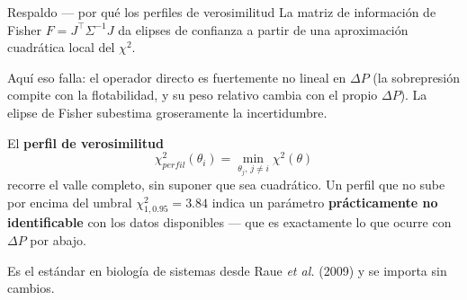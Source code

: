 \documentclass[aspectratio=169,10pt,t]{beamer}
\begin{document}
\begin{frame}{Respaldo — por qué los perfiles de verosimilitud}
\small
La matriz de información de Fisher $F=J^\top\Sigma^{-1}J$ da elipses de
confianza a partir de una \alert{aproximación cuadrática local} del $\chi^2$.

\medskip
Aquí eso falla: el operador directo es fuertemente no lineal en $\Delta P$ (la
sobrepresión compite con la flotabilidad, y su peso relativo cambia con el
propio $\Delta P$). La elipse de Fisher subestima groseramente la incertidumbre.

\medskip
El \textbf{perfil de verosimilitud}
$$\chi^2_{perfil}(\theta_i)=\min_{\theta_j,\,j\neq i}\chi^2(\theta)$$
recorre el valle completo, sin suponer que sea cuadrático. Un perfil que
\alert{no sube} por encima del umbral $\chi^2_{1,0.95}=3.84$ indica un parámetro
\textbf{prácticamente no identificable} con los datos disponibles — que es
exactamente lo que ocurre con $\Delta P$ por abajo.

\medskip
Es el estándar en biología de sistemas desde Raue \emph{et al.} (2009) y se
importa sin cambios.
\end{frame}
\end{document}

